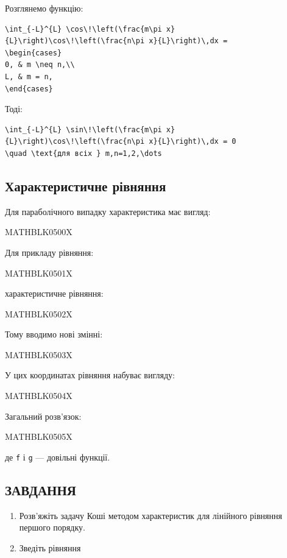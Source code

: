 \documentclass[
  ukrainian,
]{article}
\begin{document}
Розглянемо функцію:

\begin{verbatim}
\int_{-L}^{L} \cos\!\left(\frac{m\pi x}{L}\right)\cos\!\left(\frac{n\pi x}{L}\right)\,dx =
\begin{cases}
0, & m \neq n,\\
L, & m = n,
\end{cases}
\end{verbatim}

Тоді:

\begin{verbatim}
\int_{-L}^{L} \sin\!\left(\frac{m\pi x}{L}\right)\cos\!\left(\frac{n\pi x}{L}\right)\,dx = 0
\quad \text{для всіх } m,n=1,2,\dots
\end{verbatim}

\subsection{Характеристичне
рівняння}\label{ux445ux430ux440ux430ux43aux442ux435ux440ux438ux441ux442ux438ux447ux43dux435-ux440ux456ux432ux43dux44fux43dux43dux44f}

Для параболічного випадку характеристика має вигляд:

MATHBLK0500X

Для прикладу рівняння:

MATHBLK0501X

характеристичне рівняння:

MATHBLK0502X

Тому вводимо нові змінні:

MATHBLK0503X

У цих координатах рівняння набуває вигляду:

MATHBLK0504X

Загальний розв'язок:

MATHBLK0505X

де \texttt{f} і \texttt{g} --- довільні функції.

\subsection{ЗАВДАННЯ}\label{ux437ux430ux432ux434ux430ux43dux43dux44f-1}

\begin{enumerate}
\def\labelenumi{\arabic{enumi}.}
\item
  Розв'яжіть задачу Коші методом характеристик для лінійного рівняння
  першого порядку.
\item
  Зведіть рівняння
\end{enumerate}
\end{document}
